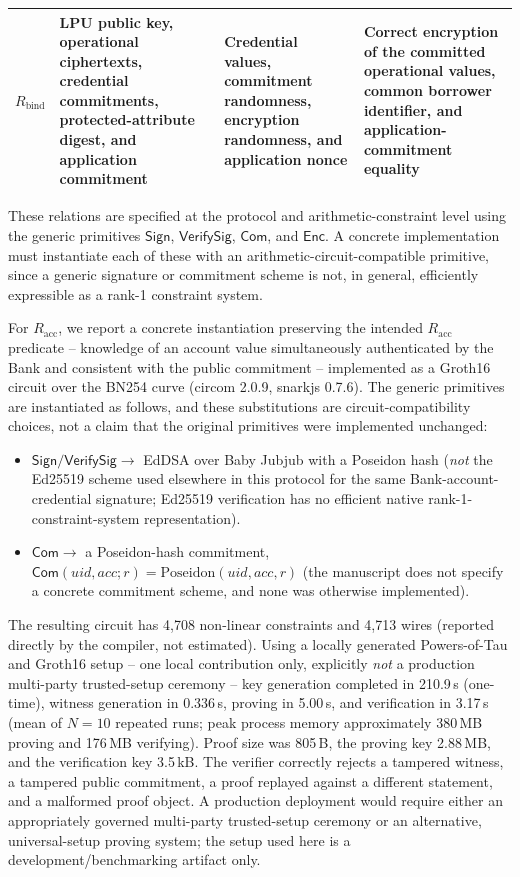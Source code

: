 \documentclass[a4paper,fleqn]{cas-dc}
\begin{document}
{\begin{table}[htbp]
\begin{tabular}{|p{2.5cm}|p{3.7cm}|p{3.8cm}|p{5.0cm}|}
$R_{\mathrm{bind}}$ & LPU public key, operational ciphertexts, credential commitments, protected-attribute digest, and application commitment & Credential values, commitment randomness, encryption randomness, and application nonce & Correct encryption of the committed operational values, common borrower identifier, and application-commitment equality \\ 
\hline 
\end{tabular} 
\end{table} 

These relations are specified at the protocol and arithmetic-constraint level using the generic primitives $\mathsf{Sign}$, $\mathsf{VerifySig}$, $\mathsf{Com}$, and $\mathsf{Enc}$. A concrete implementation must instantiate each of these with an arithmetic-circuit-compatible primitive, since a generic signature or commitment scheme is not, in general, efficiently expressible as a rank-1 constraint system.

For $R_{\mathrm{acc}}$, we report a concrete instantiation preserving the intended $R_{\mathrm{acc}}$ predicate -- knowledge of an account value simultaneously authenticated by the Bank and consistent with the public commitment -- implemented as a Groth16 circuit over the BN254 curve (circom 2.0.9, snarkjs 0.7.6). The generic primitives are instantiated as follows, and these substitutions are circuit-compatibility choices, not a claim that the original primitives were implemented unchanged:
\begin{itemize}
    \item $\mathsf{Sign}/\mathsf{VerifySig} \rightarrow$ EdDSA over Baby Jubjub with a Poseidon hash (\emph{not} the Ed25519 scheme used elsewhere in this protocol for the same Bank-account-credential signature; Ed25519 verification has no efficient native rank-1-constraint-system representation).
    \item $\mathsf{Com} \rightarrow$ a Poseidon-hash commitment, $\mathsf{Com}(uid,acc;r) = \mathrm{Poseidon}(uid,acc,r)$ (the manuscript does not specify a concrete commitment scheme, and none was otherwise implemented).
\end{itemize}
The resulting circuit has 4{,}708 non-linear constraints and 4{,}713 wires (reported directly by the compiler, not estimated). Using a locally generated Powers-of-Tau and Groth16 setup -- one local contribution only, explicitly \emph{not} a production multi-party trusted-setup ceremony -- key generation completed in 210.9\,s (one-time), witness generation in 0.336\,s, proving in 5.00\,s, and verification in 3.17\,s (mean of $N=10$ repeated runs; peak process memory approximately 380\,MB proving and 176\,MB verifying). Proof size was 805\,B, the proving key 2.88\,MB, and the verification key 3.5\,kB. The verifier correctly rejects a tampered witness, a tampered public commitment, a proof replayed against a different statement, and a malformed proof object. A production deployment would require either an appropriately governed multi-party trusted-setup ceremony or an alternative, universal-setup proving system; the setup used here is a development/benchmarking artifact only.

}
\end{document}
